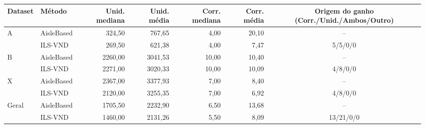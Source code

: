 \small
\begin{tabular}{llrrrrc}
\toprule
Dataset & Método & Unid. mediana & Unid. média & Corr. mediana & Corr. média & Origem do ganho (Corr./Unid./Ambos/Outro) \\
\midrule
A & AisleBased & 324,50 & 767,65 & 4,00 & 20,10 & -- \\
 & ILS-VND & 269,50 & 621,38 & 4,00 & 7,47 & 5/5/0/0 \\
B & AisleBased & 2260,00 & 3041,53 & 10,00 & 10,40 & -- \\
 & ILS-VND & 2271,00 & 3020,33 & 10,00 & 10,09 & 4/8/0/0 \\
X & AisleBased & 2367,00 & 3377,93 & 7,00 & 8,40 & -- \\
 & ILS-VND & 2120,00 & 3255,35 & 7,00 & 6,92 & 4/8/0/0 \\
Geral & AisleBased & 1705,50 & 2232,90 & 6,50 & 13,68 & -- \\
 & ILS-VND & 1460,00 & 2131,26 & 5,50 & 8,09 & 13/21/0/0 \\
\bottomrule
\end{tabular}

